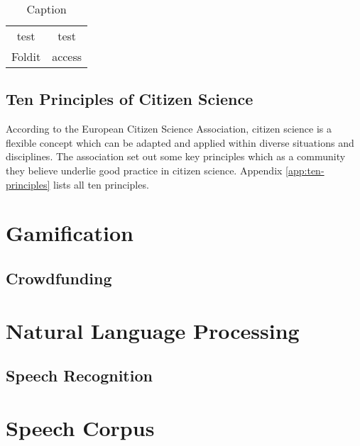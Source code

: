 \begin{table}[]
    \centering
    \begin{tabular}{c|c}
        test & test \\
        Foldit & access
    \end{tabular}
    \caption{Caption}
    \label{tab:my_label}
\end{table}

\subsection{Ten Principles of Citizen Science}

According to the European Citizen Science Association, citizen science is a flexible concept which can be adapted and applied within diverse situations and disciplines. The association set out some key principles which as a community they believe underlie good practice in citizen science. Appendix \ref{app:ten-principles} lists all ten principles.

\section{Gamification}

\subsection{Crowdfunding}

\section{Natural Language Processing}

\subsection{Speech Recognition}

\section{Speech Corpus}

\subsection{}
